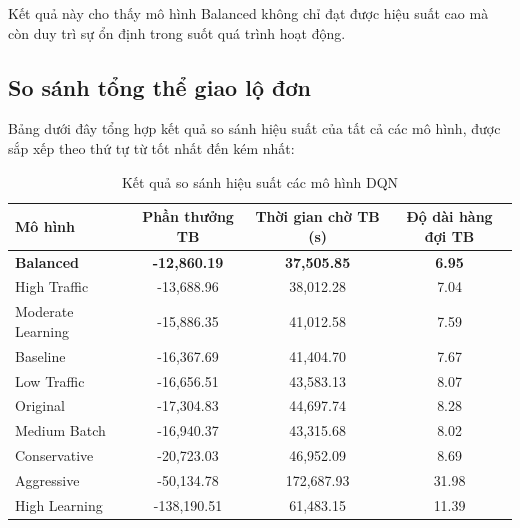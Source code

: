 Kết quả này cho thấy mô hình Balanced không chỉ đạt được hiệu suất cao mà còn duy
trì sự ổn định trong suốt quá trình hoạt động.

\subsection{So sánh tổng thể giao lộ đơn}

Bảng dưới đây tổng hợp kết quả so sánh hiệu suất của tất cả các mô hình, được sắp
xếp theo thứ tự từ tốt nhất đến kém nhất:

\begin{table}[!htp]
    \centering
    \caption{Kết quả so sánh hiệu suất các mô hình DQN}
    \label{tab:model_performance_comparison}
    \begin{tabular}{@{}lccc@{}}
        \toprule \textbf{Mô hình}  & \textbf{Phần thưởng TB} & \textbf{Thời gian chờ TB (s)} & \textbf{Độ dài hàng đợi TB} \\
        \midrule \textbf{Balanced} & \textbf{-12,860.19}     & \textbf{37,505.85}            & \textbf{6.95}               \\
        High Traffic               & -13,688.96              & 38,012.28                     & 7.04                        \\
        Moderate Learning          & -15,886.35              & 41,012.58                     & 7.59                        \\
        Baseline                   & -16,367.69              & 41,404.70                     & 7.67                        \\
        Low Traffic                & -16,656.51              & 43,583.13                     & 8.07                        \\
        Original                   & -17,304.83              & 44,697.74                     & 8.28                        \\
        Medium Batch               & -16,940.37              & 43,315.68                     & 8.02                        \\
        Conservative               & -20,723.03              & 46,952.09                     & 8.69                        \\
        Aggressive                 & -50,134.78              & 172,687.93                    & 31.98                       \\
        High Learning              & -138,190.51             & 61,483.15                     & 11.39                       \\
        \bottomrule
    \end{tabular}
\end{table}

